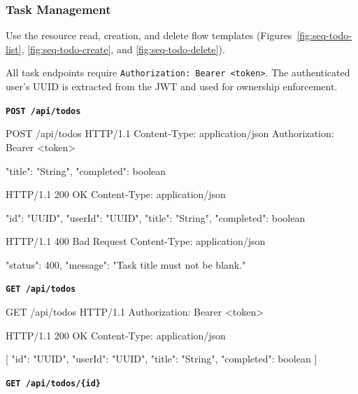 \subsubsection{Task Management}
Use the resource read, creation, and delete flow templates
(Figures~\ref{fig:seq-todo-list}, \ref{fig:seq-todo-create}, and \ref{fig:seq-todo-delete}).

All task endpoints require \texttt{Authorization: Bearer <token>}. The authenticated user's
UUID is extracted from the JWT and used for ownership enforcement.

\textbf{\texttt{POST /api/todos}}

\begin{httpexchange}
\begin{httplisting}
POST /api/todos HTTP/1.1
Content-Type: application/json
Authorization: Bearer <token>

{
    "title": "String",
    "completed": boolean
}
\end{httplisting}
\httpmidarrows
\begin{httplisting}
HTTP/1.1 200 OK
Content-Type: application/json

{
    "id": "UUID",
    "userId": "UUID",
    "title": "String",
    "completed": boolean
}

HTTP/1.1 400 Bad Request
Content-Type: application/json

{
    "status": 400,
    "message": "Task title must not be blank."
}
\end{httplisting}
\end{httpexchange}

\newpage


\textbf{\texttt{GET /api/todos}}

\begin{httpexchange}
\begin{httplisting}
GET /api/todos HTTP/1.1
Authorization: Bearer <token>
\end{httplisting}
\httpmidarrows
\begin{httplisting}
HTTP/1.1 200 OK
Content-Type: application/json

[
    {
        "id": "UUID",
        "userId": "UUID",
        "title": "String",
        "completed": boolean
    }
]
\end{httplisting}
\end{httpexchange}





\textbf{\texttt{GET /api/todos/\{id\}}}

